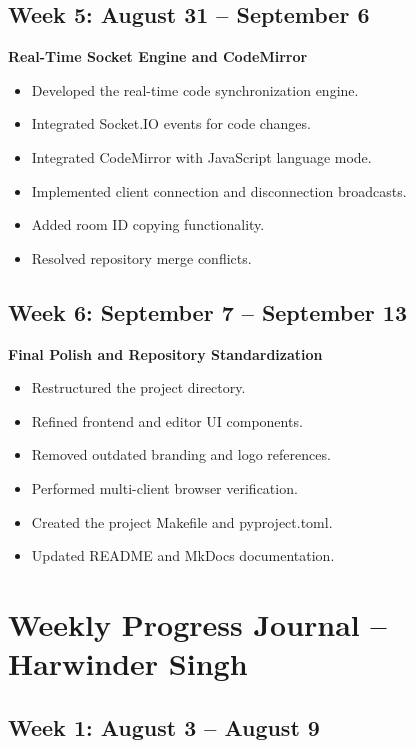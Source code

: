 \documentclass[12pt,a4paper,oneside]{report}
\begin{document}
\subsection*{Week 5: August 31 -- September 6}

\textbf{Real-Time Socket Engine and CodeMirror}

\begin{itemize}
    \item Developed the real-time code synchronization engine.
    \item Integrated Socket.IO events for code changes.
    \item Integrated CodeMirror with JavaScript language mode.
    \item Implemented client connection and disconnection broadcasts.
    \item Added room ID copying functionality.
    \item Resolved repository merge conflicts.
\end{itemize}

\subsection*{Week 6: September 7 -- September 13}

\textbf{Final Polish and Repository Standardization}

\begin{itemize}
    \item Restructured the project directory.
    \item Refined frontend and editor UI components.
    \item Removed outdated branding and logo references.
    \item Performed multi-client browser verification.
    \item Created the project Makefile and pyproject.toml.
    \item Updated README and MkDocs documentation.
\end{itemize}

\section{Weekly Progress Journal -- Harwinder Singh}

\subsection*{Week 1: August 3 -- August 9}
\end{document}
